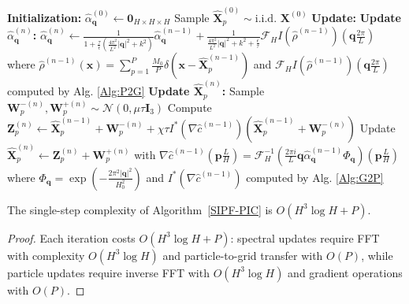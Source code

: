 \documentclass[review,onefignum,onetabnum]{siamart250211}
\begin{document}
\begin{algorithm}
\caption{SIPF-PIC method}\label{SIPF-PIC}
\begin{algorithmic}[1]
\State \textbf{Initialization:}
\State $\hat{\alpha}_{\mathbf{q}}^{(0)} \gets \mathbf{0}_{H \times H \times H}$ 
\State Sample $\widehat{\mathbf{X}}_p^{(0)} \sim \text{i.i.d. } \mathbf{X}^{(0)}$
\Statex
\State \textbf{Update:}
    \State \textbf{Update $\hat{\alpha}_{\mathbf{q}}^{(n)}$:}
    \State $\hat{\alpha}_{\mathbf{q}}^{(n)} \gets \frac{1}{1 + \frac{\tau}{\epsilon}\left(\frac{4\pi^2}{L^2}|\mathbf{q}|^2 + k^2\right)} \hat{\alpha}_{\mathbf{q}}^{(n-1)} + \frac{1}{\frac{4\pi^2}{L^2}|\mathbf{q}|^2 + k^2 + \frac{\epsilon}{\tau}} \mathcal{F}_H I(\hat{\rho}^{(n-1)})\left(\mathbf{q} \frac{2\pi}{L}\right)$
    \State where $\hat{\rho}^{(n-1)}(\mathbf{x}) = \sum_{p=1}^{P} \frac{M_0}{P} \delta(\mathbf{x} - \widehat{\mathbf{X}}_p^{(n-1)})$
    \State and $\mathcal{F}_H I(\hat{\rho}^{(n-1)})\left(\mathbf{q} \frac{2\pi}{L}\right)$ computed by Alg. \ref{Alg:P2G}
    \Statex
    \State \textbf{Update $\widehat{\mathbf{X}}_p^{(n)}$:}
        \State Sample $\mathbf{W}_p^{-(n)},\mathbf{W}_p^{+(n)} \sim \mathcal{N}(0, \mu \tau \mathbf{I}_3)$ 
        \State Compute $\mathbf{Z}_p^{(n)} \gets \widehat{\mathbf{X}}_p^{(n-1)}+\mathbf{W}_p^{-(n)} + \chi \tau I^*(\nabla \hat{c}^{(n-1)})(\widehat{\mathbf{X}}_p^{(n-1)}+\mathbf{W}_p^{-(n)})$
        \State Update $\widehat{\mathbf{X}}_p^{(n)} \gets \mathbf{Z}_p^{(n)} + \mathbf{W}_p^{+(n)}$ 
    \EndFor
    \State with $\nabla \hat{c}^{(n-1)}\left( \mathbf{p} \frac{L}{H} \right) = \mathcal{F}_H^{-1}\left(\frac{2\pi i}{L}\mathbf{q} \hat{\alpha}_{\mathbf{q}}^{(n-1)} \Phi_\mathbf{q}\right)\left( \mathbf{p} \frac{L}{H} \right)$
    \Statex {}
    \State where $\Phi_{\mathbf q}=\exp\left(-\frac{2\pi ^2|\mathbf q|^2}{H_0^2}\right)$
    \State and $I^*(\nabla \hat{c}^{(n-1)})$ computed by Alg. \ref{Alg:G2P}
\EndFor
\end{algorithmic}
\end{algorithm}

\begin{theorem}
\label{thm:overall_complexity}
The single-step complexity of Algorithm~\ref{SIPF-PIC} is \( O \left(H^3 \log H + P \right) \).
\end{theorem}
\begin{proof}
 Each iteration costs \( O(H^3 \log H + P) \): spectral updates require FFT with complexity \( O(H^3 \log H) \) and particle-to-grid transfer with \( O(P) \), while particle updates require inverse FFT with \( O(H^3 \log H) \) and gradient operations with \( O(P) \).
\end{proof}
\end{document}
